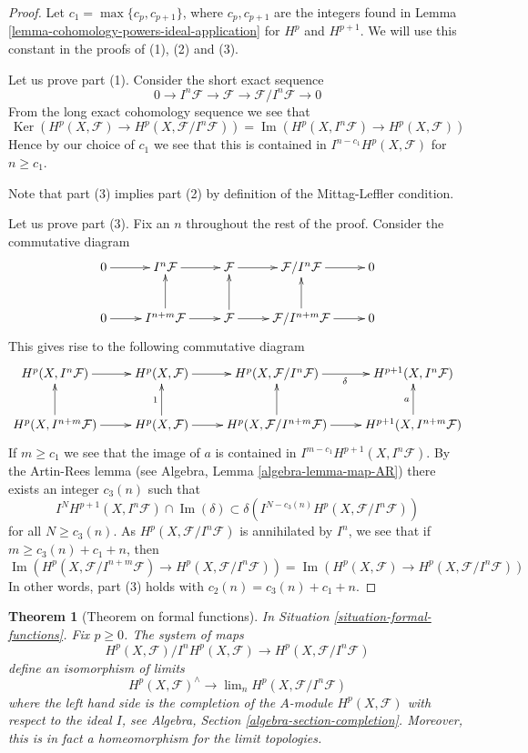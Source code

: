 \documentclass{stacks-project}
\theoremstyle{plain}
\newtheorem{theorem}[subsection]{Theorem}
\theoremstyle{definition}
\theoremstyle{remark}
\numberwithin{equation}{subsection}
\def\lim{\mathop{\mathrm{lim}}\nolimits}
\def\Ker{\mathop{\mathrm{Ker}}}
\def\Im{\mathop{\mathrm{Im}}}
\begin{document}
\begin{proof}
Let $c_1 = \max\{c_p, c_{p + 1}\}$, where $c_p, c_{p +1}$ are the integers
found in Lemma \ref{lemma-cohomology-powers-ideal-application} for
$H^p$ and $H^{p + 1}$. We will use this constant in the proofs of
(1), (2) and (3).

\medskip\noindent
Let us prove part (1). Consider the short exact sequence
$$
0 \to I^n\mathcal{F} \to \mathcal{F} \to \mathcal{F}/I^n\mathcal{F} \to 0
$$
From the long exact cohomology sequence we see that
$$
\Ker(
H^p(X, \mathcal{F}) \to H^p(X, \mathcal{F}/I^n\mathcal{F})
)
=
\Im(
H^p(X, I^n\mathcal{F}) \to H^p(X, \mathcal{F})
)
$$
Hence by our choice of $c_1$ we see that this is contained in
$I^{n - c_1}H^p(X, \mathcal{F})$ for $n \geq c_1$.

\medskip\noindent
Note that part (3) implies part (2) by definition of the Mittag-Leffler
condition.

\medskip\noindent
Let us prove part (3).
Fix an $n$ throughout the rest of the proof.
Consider the commutative diagram
$$
\xymatrix{
0 \ar[r] &
I^n\mathcal{F} \ar[r] &
\mathcal{F} \ar[r] &
\mathcal{F}/I^n\mathcal{F} \ar[r] &
0 \\
0 \ar[r] &
I^{n + m}\mathcal{F} \ar[r] \ar[u] &
\mathcal{F} \ar[r] \ar[u] &
\mathcal{F}/I^{n + m}\mathcal{F} \ar[r] \ar[u] &
0
}
$$
This gives rise to the following commutative diagram
$$
\xymatrix{
H^p(X, I^n\mathcal{F}) \ar[r] &
H^p(X, \mathcal{F}) \ar[r] &
H^p(X, \mathcal{F}/I^n\mathcal{F}) \ar[r]_\delta &
H^{p + 1}(X, I^n\mathcal{F}) \\
H^p(X, I^{n + m}\mathcal{F}) \ar[r] \ar[u] &
H^p(X, \mathcal{F}) \ar[r] \ar[u]^1 &
H^p(X, \mathcal{F}/I^{n + m}\mathcal{F}) \ar[r] \ar[u] &
H^{p + 1}(X, I^{n + m}\mathcal{F}) \ar[u]^a
}
$$
If $m \geq c_1$ we see that the image of $a$ is
contained in $I^{m - c_1} H^{p + 1}(X, I^n\mathcal{F})$.
By the Artin-Rees lemma (see Algebra, Lemma \ref{algebra-lemma-map-AR})
there exists an integer $c_3(n)$ such that
$$
I^N H^{p + 1}(X, I^n\mathcal{F}) \cap \Im(\delta)
\subset
\delta\left(I^{N - c_3(n)}H^p(X, \mathcal{F}/I^n\mathcal{F})\right)
$$
for all $N \geq c_3(n)$. As $H^p(X, \mathcal{F}/I^n\mathcal{F})$
is annihilated by $I^n$, we see that if $m \geq c_3(n) + c_1 + n$,
then
$$
\Im(H^p(X, \mathcal{F}/I^{n + m}\mathcal{F})
\to H^p(X, \mathcal{F}/I^n\mathcal{F}))
=
\Im(H^p(X, \mathcal{F})
\to H^p(X, \mathcal{F}/I^n\mathcal{F}))
$$
In other words, part (3) holds with $c_2(n) = c_3(n) + c_1 + n$.
\end{proof}

\begin{theorem}[Theorem on formal functions]
\label{theorem-formal-functions}
In Situation \ref{situation-formal-functions}. Fix $p \geq 0$.
The system of maps
$$
H^p(X, \mathcal{F})/I^nH^p(X, \mathcal{F})
\longrightarrow
H^p(X, \mathcal{F}/I^n\mathcal{F})
$$
define an isomorphism of limits
$$
H^p(X, \mathcal{F})^\wedge
\longrightarrow
\lim_n H^p(X, \mathcal{F}/I^n\mathcal{F})
$$
where the left hand side is the completion of the $A$-module
$H^p(X, \mathcal{F})$ with respect to the ideal $I$, see
Algebra, Section \ref{algebra-section-completion}.
Moreover, this is in fact a homeomorphism for the limit topologies.
\end{theorem}
\end{document}
